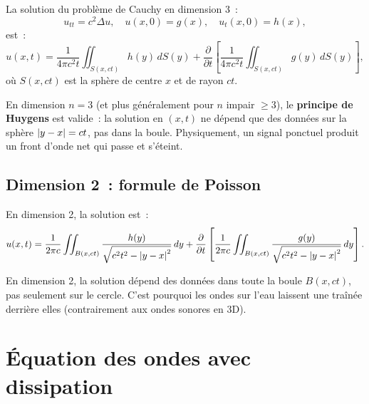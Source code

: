 \begin{theoreme}
La solution du probl\`eme de Cauchy en dimension 3~:
\[
    u_{tt} = c^2 \Delta u, \quad u(x,0) = g(x), \quad u_t(x,0) = h(x),
\]
est~:
\begin{equation}\label{eq:kirchhoff}
    u(x,t) = \frac{1}{4\pi c^2 t}\iint_{S(x,ct)} h(y)\, dS(y)
    + \frac{\partial}{\partial t}\left[\frac{1}{4\pi c^2 t}
    \iint_{S(x,ct)} g(y)\, dS(y)\right],
\end{equation}
o\`u $S(x,ct)$ est la sph\`ere de centre $x$ et de rayon $ct$.
\end{theoreme}

\begin{theoreme}
En dimension $n = 3$ (et plus g\'en\'eralement pour $n$ impair $\geq 3$),
le \textbf{principe de Huygens} est valide~: la solution en $(x,t)$ ne
d\'epend que des donn\'ees sur la sph\`ere $\left| y-x \right| = ct$, pas dans
la boule. Physiquement, un signal ponctuel produit un front d'onde net
qui passe et s'\'eteint.
\end{theoreme}

\subsection{Dimension 2~: formule de Poisson}

\begin{theoreme}
En dimension 2, la solution est~:
\begin{equation}\label{eq:poisson_ondes_2d}
    u(x,t) = \frac{1}{2\pi c}\iint_{B(x,ct)}
    \frac{h(y)}{\sqrt{c^2 t^2 - \left| y-x \right|^2}}\, dy
    + \frac{\partial}{\partial t}\left[\frac{1}{2\pi c}\iint_{B(x,ct)}
    \frac{g(y)}{\sqrt{c^2 t^2 - \left| y-x \right|^2}}\, dy\right].
\end{equation}
\end{theoreme}

\begin{attention}[title=\textbf{Pas de principe de Huygens en dimension paire}]
En dimension 2, la solution d\'epend des donn\'ees dans toute la boule
$B(x,ct)$, pas seulement sur le cercle. C'est pourquoi les ondes sur
l'eau laissent une tra\^in\'ee derri\`ere elles (contrairement aux ondes
sonores en 3D).
\end{attention}

\section{\'Equation des ondes avec dissipation}

